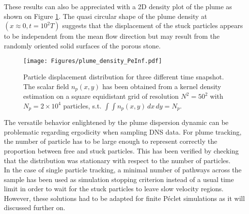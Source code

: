 These results can also be appreciated with a 2D density plot of the plume as shown on Figure \ref{fig:plume_density_peinf}. 
The quasi circular shape of the plume density at $(x\approx 0, t=10^2 T)$ suggests that the displacement of the stuck particles appears to be independent from the mean flow direction but may result from the randomly oriented solid surfaces of the porous stone.
\begin{figure}
	\centering
	\texttt{[image: Figures/plume\_density\_PeInf.pdf]}
	\caption{Particle displacement distribution for three different time snapshot. The scalar field $n_p(x,y)$ has been obtained from a kernel density estimation on a square equidistant grid of resolution $N^2=50^2$ with $N_p = 2\times 10^4$ particles, s.t. $\int\int n_p(x,y)\,dx\,dy = N_p$.}
	\label{fig:plume_density_peinf}
\end{figure}

The versatile behavior enlightened by the plume dispersion dynamic can be problematic regarding ergodicity when sampling DNS data.
For plume tracking, the number of particle has to be large enough to represent correctly the proportion between free and stuck particles.
This has been verified by checking that the distribution was stationary with respect to the number of particles.\\
In the case of single particle tracking, a minimal number of pathways across the sample has been used as simulation stopping criterion instead of a usual time limit in order to wait for the stuck particles to leave slow velocity regions.
However, these solutions had to be adapted for finite Péclet simulations as it will discussed further on.


